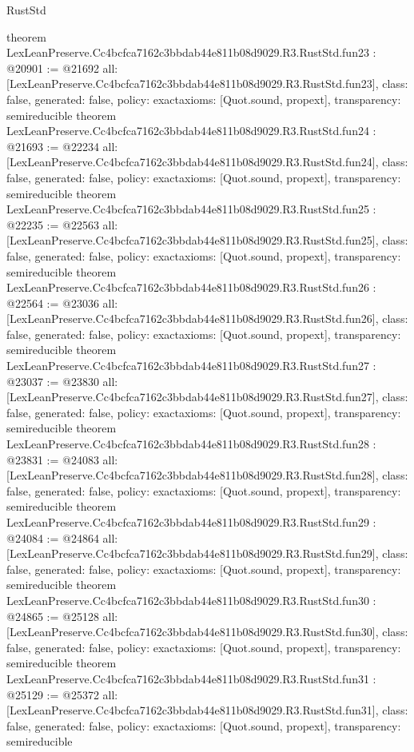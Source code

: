 \begin{lexlean}{RustStd}
\begin{coremodule}
{}
theorem LexLeanPreserve.Cc4bcfca7162c3bbdab44e811b08d9029.R3.RustStd.fun23 : @20901 := @21692 {
  all: [LexLeanPreserve.Cc4bcfca7162c3bbdab44e811b08d9029.R3.RustStd.fun23],
  class: false,
  generated: false,
  policy: exact{axioms: [Quot.sound, propext]},
  transparency: semireducible
}
theorem LexLeanPreserve.Cc4bcfca7162c3bbdab44e811b08d9029.R3.RustStd.fun24 : @21693 := @22234 {
  all: [LexLeanPreserve.Cc4bcfca7162c3bbdab44e811b08d9029.R3.RustStd.fun24],
  class: false,
  generated: false,
  policy: exact{axioms: [Quot.sound, propext]},
  transparency: semireducible
}
theorem LexLeanPreserve.Cc4bcfca7162c3bbdab44e811b08d9029.R3.RustStd.fun25 : @22235 := @22563 {
  all: [LexLeanPreserve.Cc4bcfca7162c3bbdab44e811b08d9029.R3.RustStd.fun25],
  class: false,
  generated: false,
  policy: exact{axioms: [Quot.sound, propext]},
  transparency: semireducible
}
theorem LexLeanPreserve.Cc4bcfca7162c3bbdab44e811b08d9029.R3.RustStd.fun26 : @22564 := @23036 {
  all: [LexLeanPreserve.Cc4bcfca7162c3bbdab44e811b08d9029.R3.RustStd.fun26],
  class: false,
  generated: false,
  policy: exact{axioms: [Quot.sound, propext]},
  transparency: semireducible
}
theorem LexLeanPreserve.Cc4bcfca7162c3bbdab44e811b08d9029.R3.RustStd.fun27 : @23037 := @23830 {
  all: [LexLeanPreserve.Cc4bcfca7162c3bbdab44e811b08d9029.R3.RustStd.fun27],
  class: false,
  generated: false,
  policy: exact{axioms: [Quot.sound, propext]},
  transparency: semireducible
}
theorem LexLeanPreserve.Cc4bcfca7162c3bbdab44e811b08d9029.R3.RustStd.fun28 : @23831 := @24083 {
  all: [LexLeanPreserve.Cc4bcfca7162c3bbdab44e811b08d9029.R3.RustStd.fun28],
  class: false,
  generated: false,
  policy: exact{axioms: [Quot.sound, propext]},
  transparency: semireducible
}
theorem LexLeanPreserve.Cc4bcfca7162c3bbdab44e811b08d9029.R3.RustStd.fun29 : @24084 := @24864 {
  all: [LexLeanPreserve.Cc4bcfca7162c3bbdab44e811b08d9029.R3.RustStd.fun29],
  class: false,
  generated: false,
  policy: exact{axioms: [Quot.sound, propext]},
  transparency: semireducible
}
theorem LexLeanPreserve.Cc4bcfca7162c3bbdab44e811b08d9029.R3.RustStd.fun30 : @24865 := @25128 {
  all: [LexLeanPreserve.Cc4bcfca7162c3bbdab44e811b08d9029.R3.RustStd.fun30],
  class: false,
  generated: false,
  policy: exact{axioms: [Quot.sound, propext]},
  transparency: semireducible
}
theorem LexLeanPreserve.Cc4bcfca7162c3bbdab44e811b08d9029.R3.RustStd.fun31 : @25129 := @25372 {
  all: [LexLeanPreserve.Cc4bcfca7162c3bbdab44e811b08d9029.R3.RustStd.fun31],
  class: false,
  generated: false,
  policy: exact{axioms: [Quot.sound, propext]},
  transparency: semireducible
}
\end{coremodule}
\end{lexlean}
